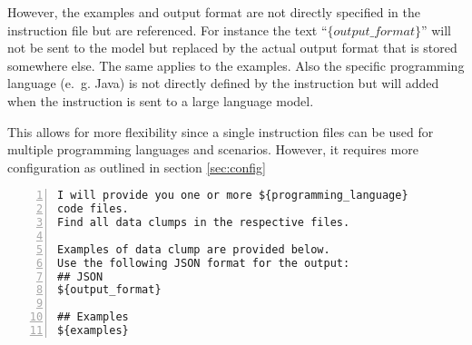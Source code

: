 However, the examples and output format are not directly specified in the instruction file but are referenced. For instance the text \enquote{$\{output\_format\}$} will not be sent to the model but replaced by the actual output format that is stored somewhere else. The same applies to the examples. Also the specific programming language (e.~g. Java) is not directly defined by the instruction but will added when the instruction is sent to a large language model.

This allows for more flexibility since a single instruction files can be used for multiple programming languages and scenarios. However, it requires more configuration as outlined in section \ref{sec:config}
\begin{lstlisting}[caption={Instruction file example}, label={lst:nstruction_template}, captionpos=b, numbers=left, ]
I will provide you one or more ${programming_language}
code files.
Find all data clumps in the respective files.

Examples of data clump are provided below.
Use the following JSON format for the output:
## JSON
${output_format}

## Examples
${examples}
\end{lstlisting}


\hfill
